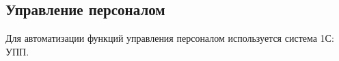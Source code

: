 \newpage
\subsection{Управление персоналом}
%
Для автоматизации функций управления персоналом используется система 1С: УПП.
